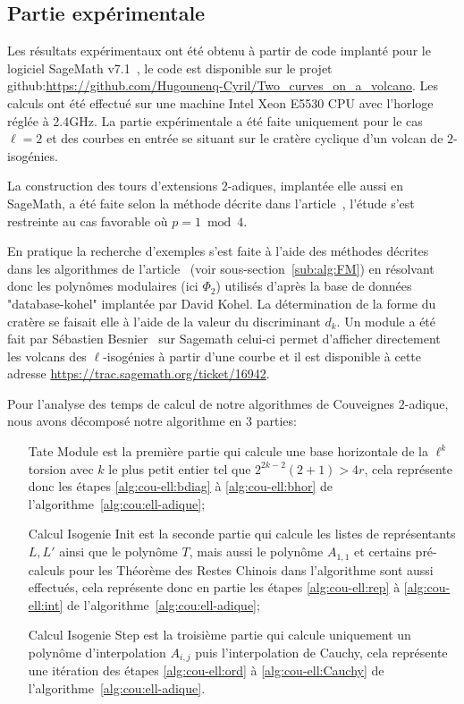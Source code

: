 \documentclass[10pt,a4paper]{book}
\theoremstyle{plain}
\theoremstyle{definition}
\theoremstyle{definition}
\theoremstyle{definition}
\theoremstyle{definition}
\theoremstyle{definition}
\theoremstyle{remark}
\theoremstyle{remark}
\theoremstyle{definition}
\begin{document}
\subsection{Partie expérimentale}
\label{ssec:exp:cou}

Les résultats expérimentaux ont été obtenu à partir de code implanté pour le 
logiciel SageMath v7.1~\cite{Sage}, le code est disponible sur le projet 
github:\url{https://github.com/Hugounenq-Cyril/Two_curves_on_a_volcano}. Les 
calculs ont été effectué sur une machine Intel Xeon E5530 CPU avec l'horloge 
réglée à 2.4GHz. La partie expérimentale a été faite uniquement pour le cas 
$\ell=2$ et des courbes en entrée se situant sur le cratère cyclique d'un 
volcan de $2$-isogénies.

La construction des tours d'extensions $2$-adiques, implantée elle aussi en 
SageMath, a été faite selon la méthode
décrite dans l'article~\cite{Doliskani-Schost15}, l'étude s'est restreinte au 
cas favorable où $p=1 \bmod 4$.

En pratique la recherche d'exemples s'est faite à l'aide des méthodes décrites
dans les algorithmes de l'article~\cite{FouquetMorain02} (voir 
sous-section~\ref{sub:alg:FM}) en résolvant donc les
polynômes modulaires (ici $\Phi_2$) utilisés d'après la base de données 
"database-kohel" implantée par David Kohel. La détermination de la forme du 
cratère se faisait elle à l'aide de la valeur du discriminant $d_k$. Un module 
a été fait par Sébastien Besnier~\cite{Besnier14} sur Sagemath celui-ci permet 
d'afficher directement les volcans des $\ell$-isogénies à partir d'une courbe 
et il est disponible à cette adresse 
\url{https://trac.sagemath.org/ticket/16942}. 

Pour l'analyse des temps de calcul de notre algorithmes de Couveignes 
$2$-adique, nous avons décomposé notre algorithme en 3 parties:
\begin{enumerate}
\item[Tate Module] est la première partie qui calcule une base horizontale de 
la $\ell^k$ torsion avec $k$ le plus petit entier tel que $2^{2k-2}(2+1)> 4r$,
cela représente donc les étapes \ref{alg:cou-ell:bdiag} à 
\ref{alg:cou-ell:bhor} de l'algorithme~\ref{alg:cou:ell-adique};
\item[Calcul Isogenie Init] est la seconde partie qui calcule les listes de 
représentants $L,L'$ ainsi que le polynôme $T$, mais aussi le polynôme 
$A_{1,1}$ et certains pré-calculs pour les Théorème des Restes Chinois dans 
l'algorithme sont aussi effectués, cela représente donc en partie les étapes 
\ref{alg:cou-ell:rep} à \ref{alg:cou-ell:int} de 
l'algorithme~\ref{alg:cou:ell-adique};
\item[Calcul Isogenie Step] est la troisième partie qui calcule uniquement 
un polynôme d'interpolation $A_{i,j}$ puis l'interpolation de 
Cauchy, cela représente une itération des étapes \ref{alg:cou-ell:ord} à 
\ref{alg:cou-ell:Cauchy} de l'algorithme~\ref{alg:cou:ell-adique}.
\end{enumerate}
\end{document}
